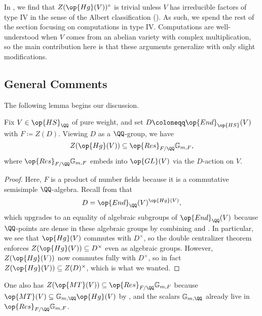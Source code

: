 \documentclass[../thesis.tex]{subfiles}
\begin{document}
In , we find that $Z(\op{Hg}(V))^\circ$ is trivial unless $V$ has irreducible factors of type IV in the sense of the Albert classification (). As such, we spend the rest of the section focusing on computations in type IV. Computations are well-understood when $V$ comes from an abelian variety with complex multiplication, so the main contribution here is that these arguments generalize with only slight modifications.

\subsection{General Comments}
The following lemma begins our discussion.
\begin{lemma} \label{lem:hg-center-in-torus}
	Fix $V\in\op{HS}_\QQ$ of pure weight, and set $D\coloneqq\op{End}_{\op{HS}}(V)$ with $F\coloneqq Z(D)$. Viewing $D$ as a $\QQ$-group, we have
	\[Z(\op{Hg}(V))\subseteq\op{Res}_{F/\QQ}\mathbb G_{m,F},\]
	where $\op{Res}_{F/\QQ}\mathbb G_{m,F}$ embeds into $\op{GL}(V)$ via the $D$-action on $V$.
\end{lemma}
\begin{proof}
	Here, $F$ is a product of number fields because it is a commutative semisimple $\QQ$-algebra. Recall from  that
	\[D=\op{End}_\QQ(V)^{\op{Hg}(V)},\]
	which upgrades to an equality of algebraic subgroups of $\op{End}_\QQ(V)$ because $\QQ$-points are dense in these algebraic groups by combining \cite[Corollary~17.92]{milne-alg-groups} and \cite[Definition~12.59]{milne-alg-groups}. In particular, we see that $\op{Hg}(V)$ commutes with $D^\times$, so the double centralizer theorem enforces $Z(\op{Hg}(V))\subseteq D^\times$ even as algebraic groups. However, $Z(\op{Hg}(V))$ now commutes fully with $D^\times$, so in fact $Z(\op{Hg}(V))\subseteq Z(D)^\times$, which is what we wanted.
\end{proof}
\begin{remark} \label{rem:mt-center-in-torus}
	One also has $Z(\op{MT}(V))\subseteq\op{Res}_{F/\QQ}\mathbb G_{m,F}$ because $\op{MT}(V)\subseteq\mathbb G_{m,\QQ}\op{Hg}(V)$ by , and the scalars $\mathbb G_{m,\QQ}$ already live in $\op{Res}_{F/\QQ}\mathbb G_{m,F}$.
\end{remark}
\end{document}
